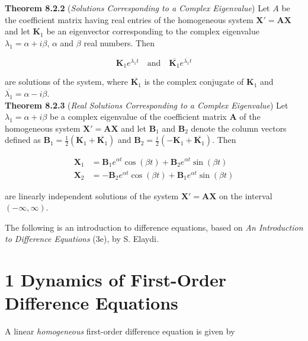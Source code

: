 \documentclass[12pt]{article}
\begin{document}
\noindent\textbf{Theorem 8.2.2} (\emph{Solutions Corresponding to a Complex Eigenvalue}) Let \(A\) be the coefficient matrix having real entries of the homogeneous system \(\mathbf{X'} = \mathbf{AX}\) and let \(\mathbf{K}_1\) be an eigenvector corresponding to the complex eigenvalue \(\lambda_1 = \alpha + i\beta\), \(\alpha\) and \(\beta\) real numbers. Then

\begin{equation}
    \mathbf{K}_1 e^{\lambda_1 t} \quad \text{and} \quad \overline{\mathbf{K}_1} e^{\overline{\lambda_1} t}
\end{equation}

\noindent are solutions of the system, where \(\overline{\mathbf{K}_1}\) is the complex conjugate of \(\mathbf{K}_1\) and \(\overline{\lambda_1} = \alpha - i\beta\).\\

\noindent\textbf{Theorem 8.2.3} (\emph{Real Solutions Corresponding to a Complex Eigenvalue}) Let \(\lambda_1 = \alpha + i\beta\) be a complex eigenvalue of the coefficient matrix \(\mathbf{A}\) of the homogeneous system \(\mathbf{X'} = \mathbf{AX}\) and let \(\mathbf{B}_1\) and \(\mathbf{B}_2\) denote the column vectors defined as \(\mathbf{B}_1 = \frac{1}{2} \left(\mathbf{K}_1 + \overline{\mathbf{K}_1}\right)\) and \(\mathbf{B}_2 = \frac{i}{2} \left(-\mathbf{K}_1 + \overline{\mathbf{K}_1}\right)\). Then

\begin{align}
    \mathbf{X}_1 &= \mathbf{B}_1 e^{\alpha t} \cos(\beta t) + \mathbf{B}_2 e^{\alpha t} \sin(\beta t)\\
    \mathbf{X}_2 &= -\mathbf{B}_2 e^{\alpha t} \cos(\beta t) + \mathbf{B}_1 e^{\alpha t} \sin(\beta t)
\end{align}

\noindent are linearly independent solutions of the system \(\mathbf{X'} = \mathbf{AX}\) on the interval \((-\infty, \infty)\).

\newpage

The following is an introduction to difference equations, based on \emph{An Introduction to Difference Equations} (3e), by S. Elaydi.

\section*{1 Dynamics of First-Order Difference Equations}

A linear \emph{homogeneous} first-order difference equation is given by
\end{document}
